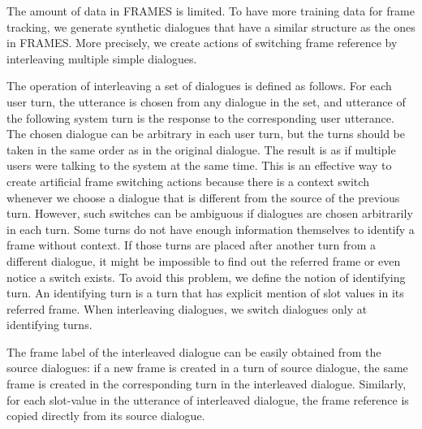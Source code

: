 \label{sec:syn}
The amount of data in FRAMES is limited. To have more training data for frame tracking, we generate synthetic dialogues that have a similar structure as the ones in FRAMES. More precisely, we create actions of switching frame reference by interleaving multiple simple dialogues.

The operation of interleaving a set of dialogues is defined as follows. For each user turn, the utterance is chosen from any dialogue in the set, and utterance of the following system turn is the response to the corresponding user utterance. The chosen dialogue can be arbitrary in each user turn, but the turns should be taken in the same order as in the original dialogue. The result is as if multiple users were talking to the system at the same time.
This is an effective way to create artificial frame switching actions because there is a context switch whenever we choose a dialogue that is different from the source of the previous turn. However, such switches can be ambiguous if dialogues are chosen arbitrarily in each turn. Some turns do not have enough information themselves to identify a frame without context. If those turns are placed after another turn from a different dialogue, it might be impossible to find out the referred frame or even notice a switch exists.
To avoid this problem, we define the notion of identifying turn. An identifying turn is a turn that has explicit mention of slot values in its referred frame. When interleaving dialogues, we switch dialogues only at identifying turns.

The frame label of the interleaved dialogue can be easily obtained from the source dialogues: if a new frame is created in a turn of source dialogue, the same frame is created in the corresponding turn in the interleaved dialogue. Similarly, for each slot-value in the utterance of interleaved dialogue, the frame reference is copied directly from its source dialogue.

